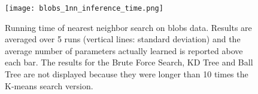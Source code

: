 \begin{figure}[tbh]
\centering
\texttt{[image: blobs\_1nn\_inference\_time.png]}
\label{fig:nn:blobs:times}

\caption{Running time of nearest neighbor search on blobs data. Results are averaged over 5 runs (vertical lines: standard deviation) and the average number of parameters actually learned is reported above each bar. The results for the Brute Force Search, KD Tree and Ball Tree are not displayed because they were longer than 10 times the K-means search version.}
\label{fig:nn:blobs}
\end{figure}


